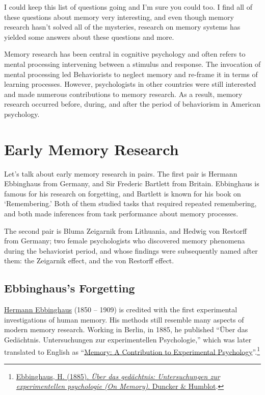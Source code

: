 \documentclass[
  oneside,
  12pt]{crumpbook}
\begin{document}
I could keep this list of questions going and I'm sure you could too. I find all of these questions about memory very interesting, and even though memory research hasn't solved all of the mysteries, research on memory systems has yielded some answers about these questions and more.

Memory research has been central in cognitive psychology and often refers to mental processing intervening between a stimulus and response. The invocation of mental processing led Behaviorists to neglect memory and re-frame it in terms of learning processes. However, psychologists in other countries were still interested and made numerous contributions to memory research. As a result, memory research occurred before, during, and after the period of behaviorism in American psychology.

\hypertarget{early-memory-research}{%
\section{Early Memory Research}\label{early-memory-research}}

Let's talk about early memory research in pairs. The first pair is Hermann Ebbinghaus from Germany, and Sir Frederic Bartlett from Britain. Ebbinghaus is famous for his research on forgetting, and Bartlett is known for his book on `Remembering.' Both of them studied tasks that required repeated remembering, and both made inferences from task performance about memory processes.

The second pair is Bluma Zeigarnik from Lithuania, and Hedwig von Restorff from Germany; two female psychologists who discovered memory phenomena during the behaviorist period, and whose findings were subsequently named after them: the Zeigarnik effect, and the von Restorff effect.

\hypertarget{ebbinghauss-forgetting}{%
\subsection{Ebbinghaus's Forgetting}\label{ebbinghauss-forgetting}}

\href{https://en.wikipedia.org/wiki/Hermann_Ebbinghaus}{Hermann Ebbinghaus} (1850 -- 1909) is credited with the first experimental investigations of human memory. His methods still resemble many aspects of modern memory research. Working in Berlin, in 1885, he published ``Über das Gedächtnis. Untersuchungen zur experimentellen Psychologie,'' which was later translated to English as ``\href{https://archive.org/details/memorycontributi00ebbiuoft}{Memory: A Contribution to Experimental Psychology}''.\footnote{\protect\hyperlink{ref-ebbinghausUberGedachtnisUntersuchungen1885}{Ebbinghaus, H. (1885). \emph{Über das gedächtnis: Untersuchungen zur experimentellen psychologie ({On Memory})}. {Duncker \& Humblot}}.}
\end{document}
